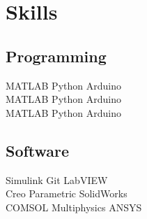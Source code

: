 \documentclass[]{deedy-resume-openfont}
\begin{document}
\begin{minipage}[t]{0.33\textwidth}
%



\section{Skills}

\subsection{Programming}


MATLAB \textbullet{}  Python \textbullet{} Arduino\\
MATLAB \textbullet{}  Python \textbullet{} Arduino\\
MATLAB \textbullet{}  Python \textbullet{} Arduino\\


\sectionsep

\subsection{Software}
Simulink \textbullet{} Git \textbullet{} LabVIEW \textbullet{}\\
Creo Parametric \textbullet{} SolidWorks \textbullet{}\\ 
COMSOL Multiphysics \textbullet{}  ANSYS


\sectionsep %


\end{minipage}
\end{document}
